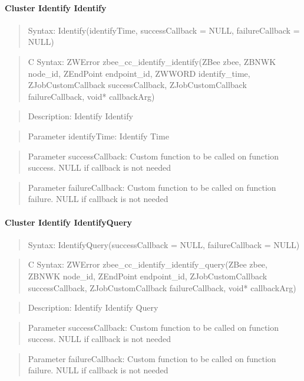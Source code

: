 \paragraph{Cluster Identify Identify}
\begin{quote}Syntax: Identify(identifyTime, successCallback = NULL, failureCallback = NULL)\end{quote}
\begin{quote}C Syntax: ZWError zbee\_cc\_identify\_identify(ZBee zbee, ZBNWK node\_id, ZEndPoint endpoint\_id, ZWWORD identify\_time, ZJobCustomCallback successCallback, ZJobCustomCallback failureCallback, void* callbackArg)\end{quote}
\begin{quote}Description: Identify Identify\end{quote}
\begin{quote}Parameter identifyTime: Identify Time\end{quote}
\begin{quote}Parameter successCallback: Custom function to be called on function success. NULL if callback is not needed\end{quote}
\begin{quote}Parameter failureCallback: Custom function to be called on function failure. NULL if callback is not needed\end{quote}


\paragraph{Cluster Identify IdentifyQuery}
\begin{quote}Syntax: IdentifyQuery(successCallback = NULL, failureCallback = NULL)\end{quote}
\begin{quote}C Syntax: ZWError zbee\_cc\_identify\_identify\_query(ZBee zbee, ZBNWK node\_id, ZEndPoint endpoint\_id, ZJobCustomCallback successCallback, ZJobCustomCallback failureCallback, void* callbackArg)\end{quote}
\begin{quote}Description: Identify Identify Query\end{quote}
\begin{quote}Parameter successCallback: Custom function to be called on function success. NULL if callback is not needed\end{quote}
\begin{quote}Parameter failureCallback: Custom function to be called on function failure. NULL if callback is not needed\end{quote}


